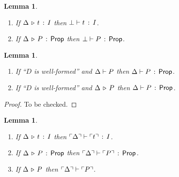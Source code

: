 \documentclass[10pt,letter]{article}
\newtheorem{lemma}[theorem]{Lemma}
\begin{document}
\begin{lemma}
  \label{lemma:l42}
  \mbox{}
  \begin{enumerate}
  \item If $\Delta \,\triangleright\, t\, :\, I$ then
    $\bot \vdash t\, :\, I$.
  \item If $\Delta \,\triangleright\, P\,:\, \mathsf{Prop}$ then
    $\bot \vdash P\, :\, \mathsf{Prop}$.
  \end{enumerate}
\end{lemma}

\begin{lemma}
  \label{lemma:wfproofs}
\mbox{}
\begin{enumerate}
\item If ``$D$ is well-formed'' and $\Delta \vdash P$ then
  $\Delta \vdash P\, :\, \mathsf{Prop}$.
\item If ``$D$ is well-formed'' and $\Delta \,\triangleright\, P$ then
  $\Delta \vdash P\, :\, \mathsf{Prop}$.
\end{enumerate}
\end{lemma}

\begin{proof}
  To be checked. 
\end{proof}

\begin{lemma}
  \label{lemma:l41}
  \mbox{}
  \begin{enumerate}
  \item If $\Delta \,\triangleright\, t\, :\, I$ then
    $\ulcorner \Delta \urcorner \vdash \ulcorner t \urcorner\, :\, I$.
  \item If $\Delta \,\triangleright\, P\,:\, \mathsf{Prop}$ then
    $\ulcorner \Delta \urcorner \vdash \ulcorner P \urcorner\, :\, \mathsf{Prop}$.
  \item If $\Delta \,\triangleright\, P$ then
    $\ulcorner \Delta \urcorner \vdash \ulcorner P \urcorner$.
  \end{enumerate}
\end{lemma}
\end{document}
